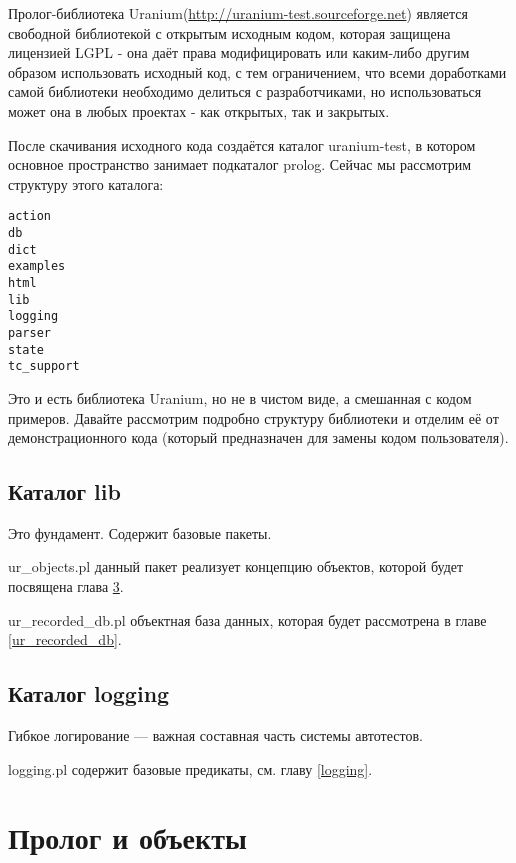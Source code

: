 \documentclass[a4paper]{book}
\def\ur{Uranium}
\begin{document}
Пролог-библиотека \ur (\url{http://uranium-test.sourceforge.net})
является свободной библиотекой с открытым исходным кодом, которая
защищена лицензией LGPL - она даёт права модифицировать или
каким-либо другим образом использовать исходный код, с тем
ограничением, что всеми доработками самой библиотеки необходимо
делиться с разработчиками, но использоваться может она в любых
проектах - как открытых, так и закрытых.

После скачивания исходного кода создаётся каталог uranium-test, в
котором основное пространство занимает подкаталог prolog. Сейчас
мы рассмотрим структуру этого каталога:

\begin{verbatim}
action
db
dict
examples
html
lib
logging
parser
state
tc_support
\end{verbatim}

Это и есть библиотека \ur, но не в чистом виде, а смешанная с
кодом примеров. Давайте рассмотрим подробно структуру библиотеки
и отделим её от демонстрационного кода (который предназначен для
замены кодом пользователя).

\section{Каталог lib}

Это фундамент. Содержит базовые пакеты.

\begin{description} 
\item ur\_objects.pl данный пакет реализует концепцию
  объектов, которой будет посвящена глава \ref{ur_objects}.
\item ur\_recorded\_db.pl объектная база данных, которая
  будет рассмотрена в главе \ref{ur_recorded_db}.
\end{description}

\section{Каталог logging}

Гибкое логирование --- важная составная часть системы автотестов.

\begin{description}
\item logging.pl содержит базовые предикаты, см. главу
  \ref{logging}.
\end{description}

\chapter{Пролог и объекты}
\label{ur_objects}
\end{document}
